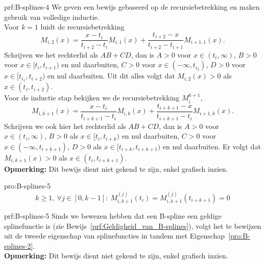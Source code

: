 \begin{prf}[B-spline]{prf:B-splines-4}
    We geven een bewijs gebaseerd op de recursiebetrekking en maken gebruik van volledige inductie. \\ 
            
    Voor $k=1$ luidt de recursiebetrekking
    \begin{equation*}
        M_{i,2}(x) = \frac{x-t_i}{t_{i+2}-t_i} M_{i,1}(x) + \frac{t_{i+2}-x}{t_{i+2}-t_{i+1}} M_{i+1,1}(x).
    \end{equation*}
    Schrijven we het rechterlid als $AB + CD$, dan is $A >0$ voor $x \in (t_i,\infty)$, $B>0$ voor $x\in [t_i,t_{i+1})$ en nul daarbuiten, $C>0$ voor $x \in (-\infty,t_{i_2})$, $D>0$ voor $x\in [t_{i_1},t_{i+2})$ en nul daarbuiten. Uit dit alles volgt dat $M_{i,2}(x) >0$ als $x \in (t_i,t_{i+2})$.  \\

    Voor de inductie stap bekijken we de recursiebetrekking $M_i^{k+1}$,
    \begin{equation*}
        M_{i,k+1}(x) = \frac{x-t_i}{t_{i+k+1}-t_i} M_{i,k}(x) + \frac{t_{i+k+1}-x}{t_{i+k+1}-t_{i}} M_{i+1,k}(x).
    \end{equation*}
    Schrijven we ook hier het rechterlid als $AB + CD$, dan is $A >0$ voor $x \in (t_i,\infty)$, $B>0$ als $x\in [t_i,t_{i+k})$ en nul daarbuiten, $C>0$ voor $x \in (-\infty,t_{i+k+1})$, $D>0$ als $x\in [t_{i+k},t_{i+k+1})$ en nul daarbuiten.  Er volgt dat $M_{i,k+1}(x) >0$ als $x \in (t_i,t_{i+k+1})$. \\

    \textbf{Opmerking:}  Dit bewijs dient niet gekend te zijn, enkel grafisch inzien.
\end{prf}

\begin{pro}[B-spline]{pro:B-splines-5}
    \begin{equation*}
        k \geq 1,\ \forall j \in [0,k-1]:\ M^{(j)}_{i,k+1}(t_i) =  M^{(j)}_{i,k+1}(t_{i+k+1}) = 0 
    \end{equation*}
    \vspace{-0.2cm}
\end{pro}

\begin{prf}[B-spline]{prf:B-splines-5}
    Sinds we bewezen hebben dat een B-spline een geldige splinefunctie is (zie Bewijs~\ref{prf:Geldigheid_van_B-splines}), volgt het te bewijzen uit de tweede eigenschap van splinefuncties in tandem met Eigenschap~\ref{pro:B-splines-2}. \\

    \textbf{Opmerking:}  Dit bewijs dient niet gekend te zijn, enkel grafisch inzien.
\end{prf}


